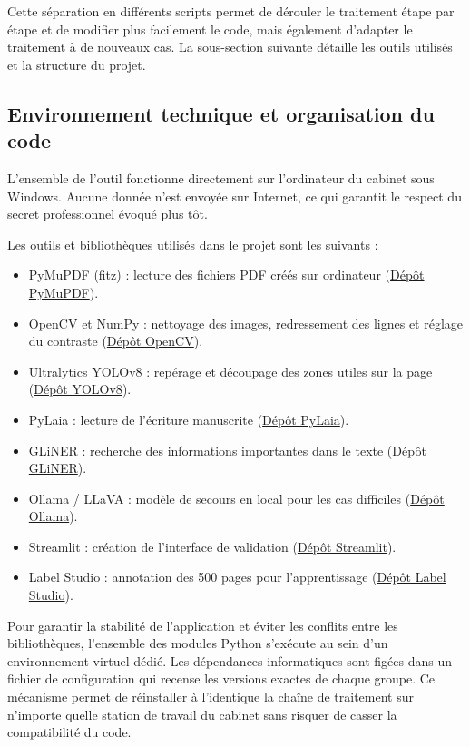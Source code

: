 Cette séparation en différents scripts permet de dérouler le traitement étape par étape et de modifier plus facilement le code, mais également d'adapter le traitement à de nouveaux cas. La sous-section suivante détaille les outils utilisés et la structure du projet.

\subsection{Environnement technique et organisation du code}

L'ensemble de l'outil fonctionne directement sur l'ordinateur du cabinet sous Windows. Aucune donnée n'est envoyée sur Internet, ce qui garantit le respect du secret professionnel évoqué plus tôt.

Les outils et bibliothèques utilisés dans le projet sont les suivants :
\begin{itemize}
  \item PyMuPDF (fitz) : lecture des fichiers PDF créés sur ordinateur (\href{https://github.com/pymupdf/PyMuPDF}{Dépôt PyMuPDF}).
  \item OpenCV et NumPy : nettoyage des images, redressement des lignes et réglage du contraste (\href{https://github.com/opencv/opencv}{Dépôt OpenCV}).
  \item Ultralytics YOLOv8 : repérage et découpage des zones utiles sur la page (\href{https://github.com/ultralytics/ultralytics}{Dépôt YOLOv8}).
  \item PyLaia : lecture de l'écriture manuscrite (\href{https://github.com/jpuigcerver/PyLaia}{Dépôt PyLaia}).
  \item GLiNER : recherche des informations importantes dans le texte (\href{https://github.com/urchade/GLiNER}{Dépôt GLiNER}).
  \item Ollama / LLaVA : modèle de secours en local pour les cas difficiles (\href{https://github.com/ollama/ollama}{Dépôt Ollama}).
  \item Streamlit : création de l'interface de validation (\href{https://github.com/streamlit/streamlit}{Dépôt Streamlit}).
  \item Label Studio : annotation des 500 pages pour l'apprentissage (\href{https://github.com/HumanSignal/label-studio}{Dépôt Label Studio}).
\end{itemize}

Pour garantir la stabilité de l'application et éviter les conflits entre les bibliothèques, l'ensemble des modules Python s'exécute au sein d'un environnement virtuel dédié. Les dépendances informatiques sont figées dans un fichier de configuration qui recense les versions exactes de chaque groupe. Ce mécanisme permet de réinstaller à l'identique la chaîne de traitement sur n'importe quelle station de travail du cabinet sans risquer de casser la compatibilité du code.

